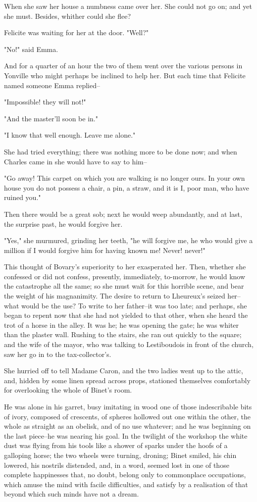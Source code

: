 \documentclass{tufte-book}
\begin{document}
When she saw her house a numbness came over her. She could not go on;
and yet she must. Besides, whither could she flee?

Felicite was waiting for her at the door. "Well?"

"No!" said Emma.

And for a quarter of an hour the two of them went over the various
persons in Yonville who might perhaps be inclined to help her. But each
time that Felicite named someone Emma replied--

"Impossible! they will not!"

"And the master'll soon be in."

"I know that well enough. Leave me alone."

She had tried everything; there was nothing more to be done now; and
when Charles came in she would have to say to him--

"Go away! This carpet on which you are walking is no longer ours. In
your own house you do not possess a chair, a pin, a straw, and it is I,
poor man, who have ruined you."

Then there would be a great sob; next he would weep abundantly, and at
last, the surprise past, he would forgive her.

"Yes," she murmured, grinding her teeth, "he will forgive me, he who
would give a million if I would forgive him for having known me! Never!
never!"

This thought of Bovary's superiority to her exasperated her. Then,
whether she confessed or did not confess, presently, immediately,
to-morrow, he would know the catastrophe all the same; so she must wait
for this horrible scene, and bear the weight of his magnanimity. The
desire to return to Lheureux's seized her--what would be the use? To
write to her father--it was too late; and perhaps, she began to repent
now that she had not yielded to that other, when she heard the trot of
a horse in the alley. It was he; he was opening the gate; he was whiter
than the plaster wall. Rushing to the stairs, she ran out quickly to the
square; and the wife of the mayor, who was talking to Lestiboudois in
front of the church, saw her go in to the tax-collector's.

She hurried off to tell Madame Caron, and the two ladies went up to
the attic, and, hidden by some linen spread across props, stationed
themselves comfortably for overlooking the whole of Binet's room.

He was alone in his garret, busy imitating in wood one of those
indescribable bits of ivory, composed of crescents, of spheres hollowed
out one within the other, the whole as straight as an obelisk, and of no
use whatever; and he was beginning on the last piece--he was nearing his
goal. In the twilight of the workshop the white dust was flying from his
tools like a shower of sparks under the hoofs of a galloping horse; the
two wheels were turning, droning; Binet smiled, his chin lowered, his
nostrils distended, and, in a word, seemed lost in one of those complete
happinesses that, no doubt, belong only to commonplace occupations,
which amuse the mind with facile difficulties, and satisfy by a
realisation of that beyond which such minds have not a dream.
\end{document}
